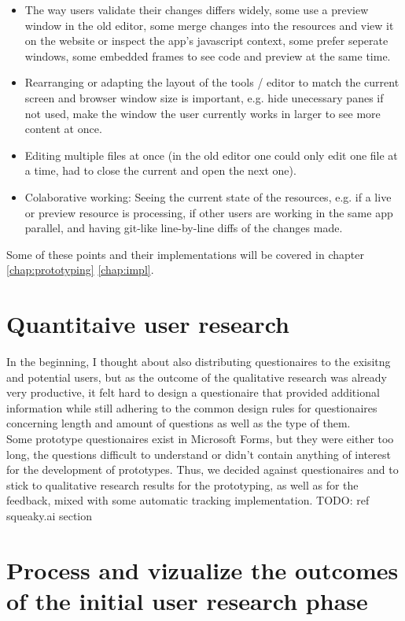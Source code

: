 \begin{itemize}
  \item The way users validate their changes differs widely, some use a preview window in the old editor, some merge changes into the resources and view it on the website or inspect the app's javascript context, some prefer seperate windows, some embedded frames to see code and preview at the same time.
  \item Rearranging or adapting the layout of the tools / editor to match the current screen and browser window size is important, e.g. hide unecessary panes if not used, make the window the user currently works in larger to see more content at once.
  \item Editing multiple files at once (in the old editor one could only edit one file at a time, had to close the current and open the next one).
  \item Colaborative working: Seeing the current state of the resources, e.g. if a live or preview resource is processing, if other users are working in the same app parallel, and having git-like line-by-line diffs of the changes made.
\end{itemize}

Some of these points and their implementations will be covered in chapter \ref*{chap:prototyping} \ref*{chap:impl}.

\section{Quantitaive user research}

In the beginning, I thought about also distributing questionaires to the exisitng and potential users, but as the outcome of the qualitative research was already very productive, it felt hard to design a questionaire that provided additional information while still adhering to the common design rules for questionaires concerning length and amount of questions as well as the type of them.
\\
Some prototype questionaires exist in Microsoft Forms, but they were either too long,
the questions difficult to understand or didn't contain anything of interest for the development of prototypes.
Thus, we decided against questionaires and to stick to qualitative research results for the prototyping, as well as for the feedback, mixed with some automatic tracking implementation. TODO: ref squeaky.ai section
\\


\section{Process and vizualize the outcomes of the initial user research phase}

